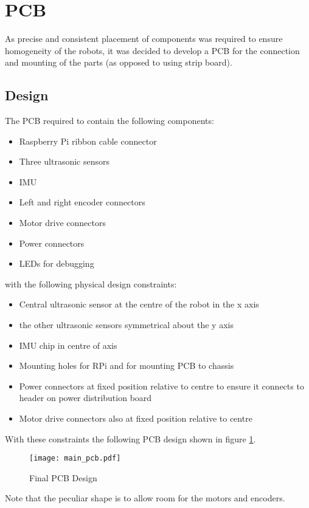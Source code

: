 \section{PCB}\label{elec/pcb}
As precise and consistent placement of components was required to ensure homogeneity of the robots, it was decided to develop a PCB for the connection and mounting of the parts (as opposed to using strip board).  
\subsection{Design}\label{elec/pcb/design}
The PCB required to contain the following components:
\begin{itemize}
  \item Raspberry Pi ribbon cable connector
  \item Three ultrasonic sensors
  \item IMU
  \item Left and right encoder connectors
  \item Motor drive connectors
  \item Power connectors
  \item LEDs for debugging
\end{itemize}

with the following physical design constraints:

\begin{itemize}
  \item Central ultrasonic sensor at the centre of the robot in the x axis
  \item the other ultrasonic sensors symmetrical about the y axis
  \item IMU chip in centre of axis
  \item Mounting holes for RPi and for mounting PCB to chassis
  \item Power connectors at fixed position relative to centre to ensure it connects to header on power distribution board
  \item Motor drive connectors also at fixed position relative to centre 
\end{itemize}



With these constraints the following PCB design shown in figure \ref{PCB_Design}.

\begin{figure}[!ht]
	\centering
	\texttt{[image: main\_pcb.pdf]}
	\caption{Final PCB Design}\label{PCB_Design}

\end{figure}
Note that the peculiar shape is to allow room for the motors and encoders. 

